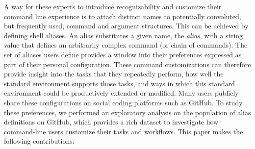 A way for these experts to introduce recognizability and customize their command line experience is to attach distinct names to potentially convoluted, but frequently used, command and argument structures.
This can be achieved by defining shell aliases.
An alias substitutes a given name, the \emph{alias}, with a string value that defines an arbitrarily complex command (or chain of commands).
The set of aliases users define provides a window into their preferences expressed as part of their personal configuration.
These command customizations can therefore provide insight into the tasks that they repeatedly perform, how well the standard environment supports those tasks, and ways in which this standard environment could be productively extended or modified.
Many users publicly share these configurations on social coding platforms such as GitHub.
To study these preferences, we performed an exploratory analysis on the population of alias definitions on GitHub, which provides a rich dataset to investigate how command-line users customize their tasks and workflows. 
This paper makes the following contributions:

